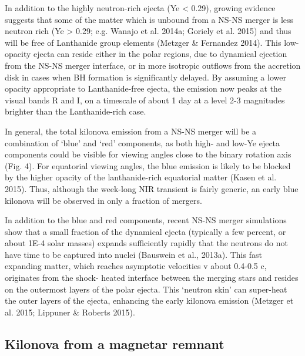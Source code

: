In addition to the highly neutron-rich ejecta (Ye < 0.29), growing evidence suggests that some of the matter which is unbound from a NS-NS merger is less neutron rich (Ye > 0.29; e.g. Wanajo et al. 2014a; Goriely et al. 2015) and thus will be free of Lanthanide group elements (Metzger \& Fernandez 2014). This low-opacity ejecta can reside either in the polar regions, due to dynamical ejection from the NS-NS merger interface, or in more isotropic outflows from the accretion disk in cases when BH formation is significantly delayed.
By assuming a lower opacity appropriate to Lanthanide-free ejecta, the emission now peaks at the visual bands R and I, on a timescale of about 1 day at a level 2-3 magnitudes brighter than the Lanthanide-rich case.

In general, the total kilonova emission from a NS-NS merger will be a combination of `blue' and `red' components, as both high- and low-Ye ejecta components could be visible for viewing angles close to the binary rotation axis (Fig. 4). For equatorial viewing angles, the blue emission is likely to be blocked by the higher opacity of the lanthanide-rich equatorial matter (Kasen et al. 2015). Thus, although the week-long NIR transient is fairly generic, an early blue kilonova will be observed in only a fraction of mergers.

In addition to the blue and red components, recent NS-NS merger simulations show that a small fraction of the dynamical ejecta (typically a few percent, or about 1E-4 solar masses) expands sufficiently rapidly that the neutrons do not have time to be captured into nuclei (Bauswein et al., 2013a). This fast expanding matter, which reaches asymptotic velocities v about 0.4-0.5 c, originates from the shock- heated interface between the merging stars and resides on the outermost layers of the polar ejecta. This `neutron skin' can super-heat the outer layers of the ejecta, enhancing the early kilonova emission (Metzger et al. 2015; Lippuner \& Roberts 2015).

\subsection{Kilonova from a magnetar remnant}

